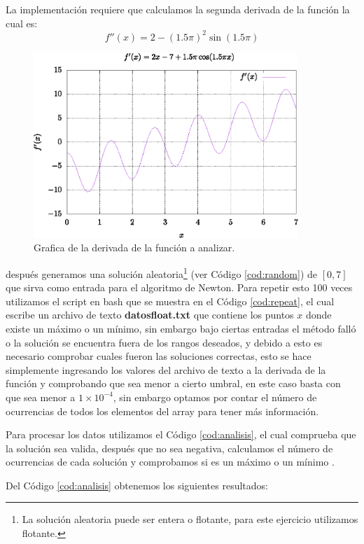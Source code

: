 \documentclass[10pt,a4paper]{article}
\begin{document}
La implementación requiere que calculamos la segunda derivada de la función la cual es:
\begin{equation}
f''(x) = 2 - (1.5 \pi)^{2} \sin(1.5 \pi)
\end{equation}
\begin{figure}[ht!]
\centering
\includegraphics[width=10cm]{grafica2.eps}
\caption{Grafica de la derivada de la función a analizar.}
\label{fig:g2}
\end{figure}
después generamos una solución aleatoria\footnote{La solución aleatoria puede ser entera o flotante, para este ejercicio utilizamos flotante.} (ver Código \ref{cod:random}) de $[0,7]$ que sirva como entrada para el algoritmo de Newton. Para repetir esto 100 veces utilizamos el script en bash que se muestra en el Código \ref{cod:repeat}, el cual escribe un archivo de texto \textbf{datosfloat.txt} que contiene los puntos $x$ donde existe un máximo o un mínimo, sin embargo bajo ciertas entradas el método falló o la solución se encuentra fuera de los rangos deseados, y debido a esto es necesario comprobar cuales fueron las soluciones correctas, esto se hace simplemente ingresando los valores del archivo de texto a la derivada de la función y comprobando que sea menor a cierto umbral, en este caso basta con que sea menor a $1 \times 10^{-4}$, sin embargo optamos por contar el número de ocurrencias de todos los elementos del array para tener más información.

Para procesar los datos utilizamos el Código \ref{cod:analisis}, el cual comprueba que la solución sea valida, después que no sea negativa, calculamos el número de ocurrencias de cada solución y comprobamos si es un máximo o un mínimo .

Del Código \ref{cod:analisis} obtenemos los siguientes resultados:
\end{document}

